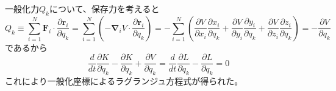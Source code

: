 \documentclass{jsarticle}
\begin{document}
一般化力\(Q_{k}\)について、保存力を考えると
\[Q_{k}\equiv\sum_{i=1}^{N}\bm{F}_{i}\cdot\frac{\partial\bm{r}_{i}}{\partial q_{k}}=\sum_{i=1}^{N}\left(-\bm{\nabla}_{i}V\cdot\frac{\partial\bm{r}_{i}}{\partial q_{k}}\right)=-\sum_{i=1}^{N}\left(\frac{\partial V}{\partial x_{i}}\frac{\partial x_{i}}{\partial q_{k}}+\frac{\partial V}{\partial y_{i}}\frac{\partial y_{i}}{\partial q_{k}}+\frac{\partial V}{\partial z_{i}}\frac{\partial z_{i}}{\partial q_{k}}\right)=-\frac{\partial V}{\partial q_{k}}\]
であるから
\[\frac{d}{dt}\frac{\partial K}{\partial\dot{q}_{k}}-\frac{\partial K}{\partial q_{k}}+\frac{\partial V}{\partial q_{k}}=\frac{d}{dt}\frac{\partial L}{\partial\dot{q}_{k}}-\frac{\partial L}{\partial q_{k}}=0\]
これにより一般化座標によるラグランジュ方程式が得られた。
\end{document}
